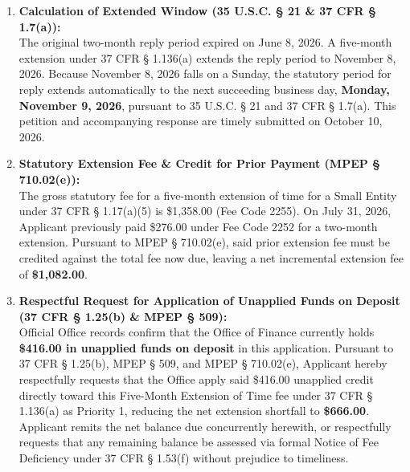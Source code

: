 \documentclass[11pt,letterpaper]{article}
\begin{document}
\begin{enumerate}[leftmargin=*]
    \item \textbf{Calculation of Extended Window (35 U.S.C. \S{} 21 \& 37 CFR \S{} 1.7(a)):} \\
    The original two-month reply period expired on June 8, 2026. A five-month extension under 37 CFR \S{} 1.136(a) extends the reply period to November 8, 2026. Because November 8, 2026 falls on a Sunday, the statutory period for reply extends automatically to the next succeeding business day, \textbf{Monday, November 9, 2026}, pursuant to 35 U.S.C. \S{} 21 and 37 CFR \S{} 1.7(a). This petition and accompanying response are timely submitted on October 10, 2026.

    \item \textbf{Statutory Extension Fee \& Credit for Prior Payment (MPEP \S{} 710.02(e)):} \\
    The gross statutory fee for a five-month extension of time for a Small Entity under 37 CFR \S{} 1.17(a)(5) is \$1,358.00 (Fee Code 2255). On July 31, 2026, Applicant previously paid \$276.00 under Fee Code 2252 for a two-month extension. Pursuant to MPEP \S{} 710.02(e), said prior extension fee must be credited against the total fee now due, leaving a net incremental extension fee of \textbf{\$1,082.00}.

    \item \textbf{Respectful Request for Application of Unapplied Funds on Deposit (37 CFR \S{} 1.25(b) \& MPEP \S{} 509):} \\
    Official Office records confirm that the Office of Finance currently holds \textbf{\$416.00 in unapplied funds on deposit} in this application. Pursuant to 37 CFR \S{} 1.25(b), MPEP \S{} 509, and MPEP \S{} 710.02(e), Applicant hereby respectfully requests that the Office apply said \$416.00 unapplied credit directly toward this Five-Month Extension of Time fee under 37 CFR \S{} 1.136(a) as Priority 1, reducing the net extension shortfall to \textbf{\$666.00}. Applicant remits the net balance due concurrently herewith, or respectfully requests that any remaining balance be assessed via formal Notice of Fee Deficiency under 37 CFR \S{} 1.53(f) without prejudice to timeliness.
\end{enumerate}
\end{document}
